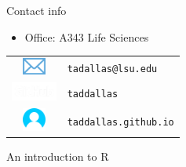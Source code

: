 \documentclass[12pt]{beamer}
\begin{document}
\begin{frame}

{\large \textcolor{lsu1}{Contact info}}

  \begin{itemize}
    \item \textcolor{lsu2}{Office:} A343 Life Sciences
  \end{itemize}

  \begin{flushright}
    \begin{tabular}{cl}
    \includegraphics[width=0.75cm]{figs/email.png} & \texttt{tadallas@lsu.edu} \\
    \includegraphics[width=1.5cm]{figs/octocat.png} & \texttt{taddallas} \\
    \includegraphics[width=0.75cm]{figs/user.png} & \texttt{taddallas.github.io}\\
   \end{tabular}
  \end{flushright}
\end{frame}





























\begin{frame}

  \Large \textcolor{boss1}{An introduction to R}

\end{frame}
\end{document}
